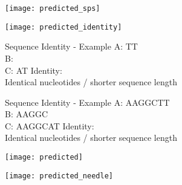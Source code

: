 \begin{frame}[c]{}
    \center
    \texttt{[image: predicted\_sps]}
\end{frame}


\begin{frame}[c]{}
    \center
    \texttt{[image: predicted\_identity]}
\end{frame}



\begin{frame}[c]{Sequence Identity - Example}
    A: \only<4-5>{AAGGC}TT \\
    B:  \\
    C: AT \newline
    \newline
    Identity:  \\
    Identical nucleotides / shorter sequence length
\end{frame}


\begin{frame}[c]{Sequence Identity - Example}
    A: {\color{ForestGreen}AAGGC}{\color{red}T}{\color{ForestGreen}T} \\
    B: AAGGC \\
    C: {\color{ForestGreen}AAGGC}{\color{red}A}{\color{ForestGreen}T} \newline
    \newline
    Identity:  \\
    Identical nucleotides / shorter sequence length
\end{frame}


\begin{frame}[c]{}
    \center
    \texttt{[image: predicted]}
    \pause
\end{frame}


\begin{frame}[c]{}
    \center
    \texttt{[image: predicted\_needle]}
\end{frame}



